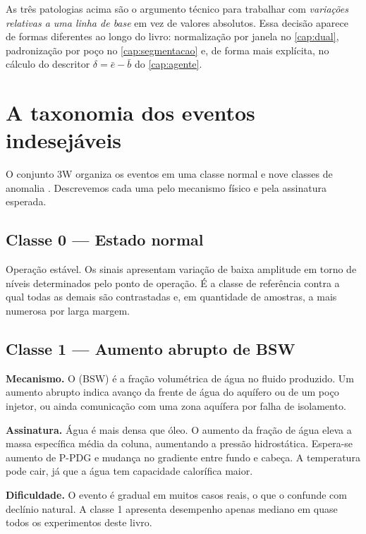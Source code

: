 \begin{destaque}
As três patologias acima são o argumento técnico para trabalhar com \emph{variações
relativas a uma linha de base} em vez de valores absolutos. Essa decisão aparece de
formas diferentes ao longo do livro: normalização por janela no \cref{cap:dual},
padronização por poço no \cref{cap:segmentacao} e, de forma mais explícita, no cálculo
do descritor $\delta = \bar{e} - \bar{b}$ do \cref{cap:agente}.
\end{destaque}

\section{A taxonomia dos eventos indesejáveis}
\label{sec:dominio-taxonomia}

O conjunto 3W organiza os eventos em uma classe normal e nove classes de anomalia
\citep{VARGAS2019,VazVargas2026_3w2}. Descrevemos cada uma pelo mecanismo físico e pela
assinatura esperada.

\subsection{Classe 0 --- Estado normal}

Operação estável. Os sinais apresentam variação de baixa amplitude em torno de níveis
determinados pelo ponto de operação. É a classe de referência contra a qual todas as
demais são contrastadas e, em quantidade de amostras, a mais numerosa por larga
margem.

\subsection{Classe 1 --- Aumento abrupto de BSW}

\textbf{Mecanismo.} O  (BSW)
é a fração volumétrica de água no fluido produzido. Um aumento abrupto indica avanço
da frente de água do aquífero ou de um poço injetor, ou ainda comunicação com uma zona
aquífera por falha de isolamento.

\textbf{Assinatura.} Água é mais densa que óleo. O aumento da fração de água eleva a
massa específica média da coluna, aumentando a pressão hidrostática. Espera-se aumento
de P-PDG e mudança no gradiente entre fundo e cabeça. A temperatura pode cair, já que a
água tem capacidade calorífica maior.

\textbf{Dificuldade.} O evento é gradual em muitos casos reais, o que o confunde com
declínio natural. A classe 1 apresenta desempenho apenas mediano em quase todos os
experimentos deste livro.

